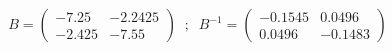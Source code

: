 

\[
B = \left( \begin{array}{ll} -7.25 &  -2.2425 \\ -2.425 &  -7.55 \end{array} \right) \;\; ; \;\; B^{-1} = \left( \begin{array}{ll} -0.1545 &  0.0496 \\ 0.0496 &  -0.1483 \end{array} \right)
\]


